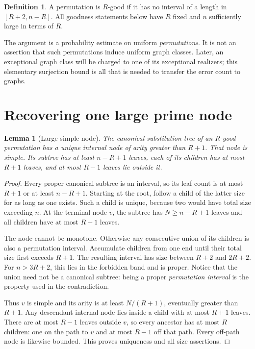 \documentclass[11pt,letterpaper]{article}
\numberwithin{equation}{section}
\newtheorem{lemma}[theorem]{Lemma}
\theoremstyle{definition}\newtheorem{definition}[theorem]{Definition}
\theoremstyle{remark}\newtheorem{remark}[theorem]{Remark}
\begin{document}
\begin{definition}
A permutation is $R$-good if it has no interval of a length in
$[R+2,n-R]$. All goodness statements below have $R$ fixed and
$n$ sufficiently large in terms of $R$.
\end{definition}

The argument is a probability estimate on uniform \emph{permutations}.
It is not an assertion that such permutations induce uniform graph
classes. Later, an exceptional graph class will be charged to one
of its exceptional realizers; this elementary surjection bound is
all that is needed to transfer the error count to graphs.

\section{Recovering one large prime node}\label{prg:sec:core}

\begin{lemma}[Large simple node]\label{prg:lem:large}
The canonical substitution tree of an $R$-good permutation has a
unique internal node of arity greater than $R+1$. That node is
simple. Its subtree has at least $n-R+1$ leaves, each of its children
has at most $R+1$ leaves, and at most $R-1$ leaves lie outside it.
\end{lemma}
\begin{proof}
Every proper canonical subtree is an interval, so its leaf count
is at most $R+1$ or at least $n-R+1$. Starting at the root, follow
a child of the latter size for as long as one exists. Such a child
is unique, because two would have total size exceeding $n$. At the
terminal node $v$, the subtree has $N\geq n-R+1$ leaves and all
children have at most $R+1$ leaves.

The node cannot be monotone. Otherwise any consecutive union of its
children is also a permutation interval. Accumulate children from
one end until their total size first exceeds $R+1$. The resulting
interval has size between $R+2$ and $2R+2$. For $n>3R+2$, this lies
in the forbidden band and is proper. Notice that the union need not
be a canonical subtree: being a proper \emph{permutation interval}
is the property used in the contradiction.

Thus $v$ is simple and its arity is at least $N/(R+1)$, eventually
greater than $R+1$. Any descendant internal node lies inside a child
with at most $R+1$ leaves. There are at most $R-1$ leaves outside
$v$, so every ancestor has at most $R$ children: one on the path to
$v$ and at most $R-1$ off that path. Every off-path node is likewise
bounded. This proves uniqueness and all size assertions.
\end{proof}
\end{document}
